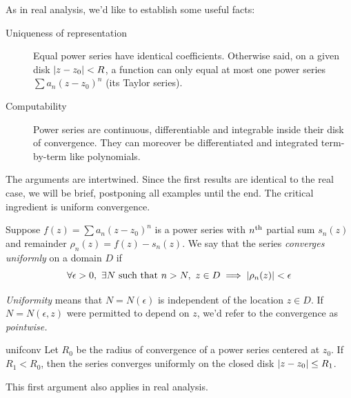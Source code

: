 As in real analysis, we'd like to establish some useful facts:
\begin{description}
  \item[Uniqueness of representation] Equal power series have identical coefficients. Otherwise said, on a given disk $\left| z-z_0\right|<R$, a function can only equal at most one power series $\sum a_n(z-z_0)^n$ (its Taylor series).
  \item[Computability] Power series are continuous, differentiable and integrable inside their disk of convergence. They can moreover be differentiated and integrated term-by-term like polynomials.
\end{description}

The arguments are intertwined. Since the first results are identical to the real case, we will be brief, postponing all examples until the end. The critical ingredient is uniform convergence.

\begin{defn}{}{}
	Suppose $f(z)=\sum a_n(z-z_0)^n$ is a power series with $n\textsuperscript{th}$ partial sum $s_n(z)$ and remainder $\rho_n(z) = f(z) - s_n(z)$. We say that the series \emph{converges uniformly} on a domain $D$ if
	\[
		\forall\epsilon>0,\ \exists N\text{ such that }n>N,\ z\in D\implies \left| \rho_n(z)\right|<\epsilon
	\]
\end{defn}

\emph{Uniformity} means that $N=N(\epsilon)$ is independent of the location $z\in D$. If $N=N(\epsilon,z)$ were permitted to depend on $z$, we'd refer to the convergence as \emph{pointwise.}

\begin{thm}{}{unifconv}
	Let $R_0$ be the radius of convergence of a power series centered at $z_0$. If $R_1<R_0$, then the series converges uniformly on the closed disk $\left| z-z_0\right|\le R_1$.
\end{thm}

This first argument also applies in real analysis.

